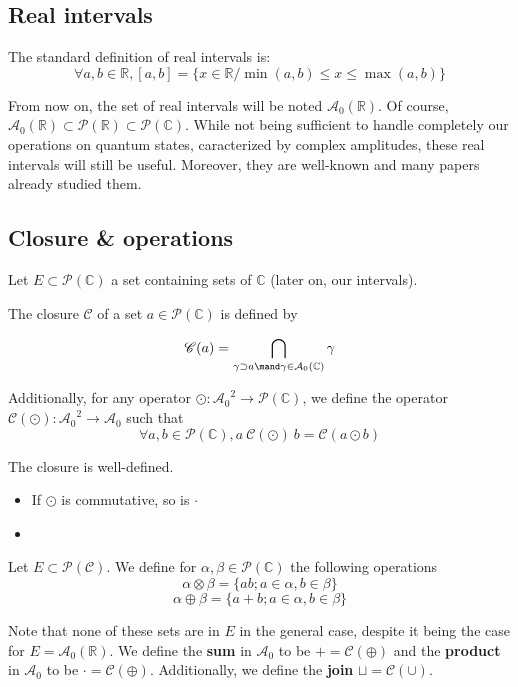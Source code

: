 \subsection{Real intervals}

The standard definition of real intervals is:
$$\forall a, b \in \mathbb{R}, [a, b]
= \{x \in \mathbb{R} / \min(a, b) \le x \le \max(a, b)\}$$

From now on, the set of real intervals will be noted $\mathcal{A}_0(\mathbb{R})$. Of course, $\mathcal{A}_0(\mathbb{R}) \subset \mathcal{P}(\mathbb{R}) \subset \mathcal{P}(\mathbb{C})$. While not being sufficient to handle completely our operations on quantum states, caracterized by complex amplitudes, these real intervals will still be useful. Moreover, they are well-known and many papers already studied them.

\subsection{Closure \& operations}
\label{closure-operations}

Let $E \subset \mathcal{P}(\mathbb{C})$ a set containing sets of $\mathbb{C}$ (later on, our intervals).

\begin{definition}[closure]
    The closure $\mathscr{C}$ of a set $a \in \mathcal P (\mathbb C)$ is defined by

    $$\mathscr{C}(a) = \bigcap_{\gamma \supset a \mand \gamma \in \mathcal{A}_0(\mathbb{C})} \gamma$$

    Additionally, for any operator
    $\odot : {\mathcal{A}_0}^2 \rightarrow \mathcal{P}(\mathbb C)$,
    we define the operator
    $\mathscr C(\odot) : {\mathcal{A}_0}^2 \rightarrow \mathcal{A}_0$
    such that
    $$\forall a, b \in \mathcal P (\mathbb C),
    a ~ \mathscr C(\odot) ~ b = \mathscr C (a \odot b)$$
\end{definition}

\begin{prop}[colsure]
    The closure is well-defined.
    \begin{itemize}
        \item If $\odot$ is commutative, so is $\cdot$
        \item 
    \end{itemize}
\end{prop}

\begin{definition}[operations]
    Let $E \subset \mathcal{P}(\mathcal C)$. We define for $\alpha, \beta \in \mathcal{P}(\mathbb C)$ the following operations
    $$\alpha \otimes \beta = \{a b ; a \in \alpha, b \in \beta\}$$
    $$\alpha \oplus \beta = \{a + b ; a \in \alpha, b \in \beta\}$$

    Note that none of these sets are in $E$ in the general case, despite it being the case for $E = \mathcal{A}_0(\mathbb{R})$. We define the \textbf{sum} in $\mathcal{A}_0$ to be $+ = \mathscr{C}(\oplus)$ and the \textbf{product} in $\mathcal{A}_0$ to be $\cdot = \mathscr{C}(\oplus)$. Additionally, we define the \textbf{join} $\sqcup = \mathscr{C}(\cup)$.
\end{definition}

